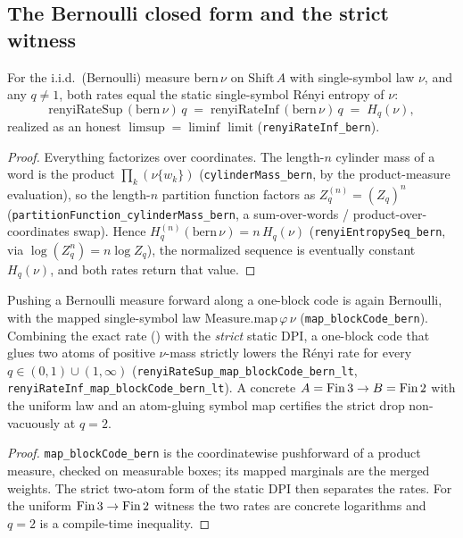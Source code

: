 \subsection*{The Bernoulli closed form and the strict witness}

\begin{theorem}\label{renyiRateSup_bern}
  \leanok
  For the i.i.d.\ (Bernoulli) measure \(\mathrm{bern}\,\nu\) on \(\mathrm{Shift}\,A\) with
  single-symbol law \(\nu\), and any \(q \ne 1\), both rates equal the static single-symbol R\'enyi
  entropy of \(\nu\):
  \[
    \mathrm{renyiRateSup}\,(\mathrm{bern}\,\nu)\,q
      \;=\; \mathrm{renyiRateInf}\,(\mathrm{bern}\,\nu)\,q
      \;=\; H_q(\nu),
  \]
  realized as an honest \(\limsup = \liminf\) limit (\texttt{renyiRateInf\_bern}).
\end{theorem}
\begin{proof}\leanok
  Everything factorizes over coordinates. The length-\(n\) cylinder mass of a word is the product
  \(\prod_k (\nu\{w_k\})\) (\texttt{cylinderMass\_bern}, by the product-measure evaluation), so the
  length-\(n\) partition function factors as \(Z_q^{(n)} = (Z_q)^n\)
  (\texttt{partitionFunction\_cylinderMass\_bern}, a sum-over-words / product-over-coordinates swap).
  Hence \(H_q^{(n)}(\mathrm{bern}\,\nu) = n\,H_q(\nu)\) (\texttt{renyiEntropySeq\_bern}, via
  \(\log(Z_q^n) = n\log Z_q\)), the normalized sequence is eventually constant \(H_q(\nu)\), and both
  rates return that value.
\end{proof}

\begin{theorem}\label{renyiRate_strict_drop_uniformFin3}
  \leanok
  Pushing a Bernoulli measure forward along a one-block code is again Bernoulli, with the mapped
  single-symbol law \(\mathrm{Measure.map}\,\varphi\,\nu\) (\texttt{map\_blockCode\_bern}). Combining
  the exact rate () with the \emph{strict} static DPI, a one-block code that
  glues two atoms of positive \(\nu\)-mass strictly lowers the R\'enyi rate for every
  \(q \in (0,1) \cup (1,\infty)\) (\texttt{renyiRateSup\_map\_blockCode\_bern\_lt},
  \texttt{renyiRateInf\_map\_blockCode\_bern\_lt}). A concrete \(A = \operatorname{Fin} 3 \to B = \operatorname{Fin} 2\) with the
  uniform law and an atom-gluing symbol map certifies the strict drop non-vacuously at \(q = 2\).
\end{theorem}
\begin{proof}\leanok
  \texttt{map\_blockCode\_bern} is the coordinatewise pushforward of a product measure, checked on
  measurable boxes; its mapped marginals are the merged weights. The strict two-atom form of the
  static DPI then separates the rates. For the uniform \(\operatorname{Fin} 3 \to \operatorname{Fin} 2\) witness the two rates are
  concrete logarithms and \(q = 2\) is a compile-time inequality.
\end{proof}

